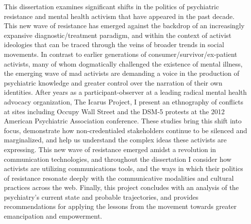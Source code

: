 %

\hfill
\vfill

\begingroup
	\noindent
\endgroup 

\bigskip
\bigskip

\noindent
This dissertation examines significant shifts in the politics of psychiatric resistance and mental health activism that have appeared in the past decade. This new wave of resistance has emerged against the backdrop of an increasingly expansive diagnostic/treatment paradigm, and within the context of activist ideologies that can be traced through the veins of broader trends in social movements. In contrast to earlier generations of consumer/survivor/ex-patient activists, many of whom dogmatically challenged the existence of mental illness, the emerging wave of mad activists are demanding a voice in the production of psychiatric knowledge and greater control over the narration of their own identities. After years as a participant-observer at a leading radical mental health advocacy organization, The Icarus Project, I present an ethnography of conflicts at sites including Occupy Wall Street and the DSM-5 protests at the 2012 American Psychiatric Association conference. These studies bring this shift into focus, demonstrate how non-credentialed stakeholders continue to be silenced and marginalized, and help us understand the complex ideas these activists are expressing. This new wave of resistance emerged amidst a revolution in communication technologies, and throughout the dissertation I consider how activists are utilizing communications tools, and the ways in which their politics of resistance resonate deeply with the communicative modalities and cultural practices across the web. Finally, this project concludes with an analysis of the psychiatry’s current state and probable trajectories, and provides recommendations for applying the lessons from the movement towards greater emancipation and empowerment.